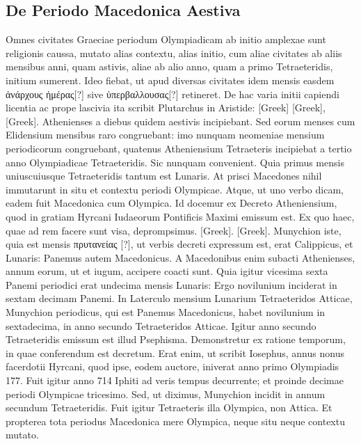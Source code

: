 \subsection{De Periodo Macedonica Aestiva}

Omnes civitates Graeciae periodum Olympiadicam ab initio
amplexae sunt religionis caussa, mutato alias contextu, alias
initio, cum aliae civitates ab aliis mensibus anni, quam astivis,
aliae ab alio anno, quam a primo Tetraeteridis, initium sumerent.
Ideo
fiebat, ut apud diversas civitates idem mensis easdem
 \textgreek{ἀνάρχους ἡμέρας[?]}
sive \textgreek{ὑπερβαλλουσας[?]} retineret.
De hac varia initii capiendi licentia ac
prope lascivia ita scribit Plutarchus in Aristide: \textgreek{[Greek]}
\textgreek{[Greek]},
\textgreek{[Greek]}.
Athenienses a diebus
quidem aestivis incipiebant.
Sed eorum menses cum Elidensium
mensibus raro congruebant: imo nunquam neomeniae mensium periodicorum
congruebant, quatenus Atheniensium Tetraeteris incipiebat
a tertio anno Olympiadicae Tetraeteridis.
Sic nunquam convenient.
Quia primus mensis uniuscuiusque Tetraeteridis tantum est
Lunaris.
At prisci Macedones nihil immutarunt in situ et contextu
periodi Olympicae.
Atque, ut uno verbo dicam, eadem fuit Macedonica
cum Olympica.
Id docemur ex Decreto Atheniensium, quod in
gratiam Hyrcani Iudaeorum Pontificis Maximi emissum est.
Ex quo
haec, quae ad rem facere sunt visa, deprompsimus.
\textgreek{[Greek]}.
\textgreek{[Greek]}.
Munychion
iste, quia est mensis \textgreek{πρυτανείας [?]},
 ut verbis decreti expressum est,
erat Calippicus, et Lunaris: Panemus autem Μacedonicus.
A Macedonibus
enim subacti Athenienses, annum eorum, ut et iugum, accipere
coacti sunt.
Quia igitur vicesima sexta Panemi periodici erat undecima
mensis Lunaris: Ergo novilunium inciderat in sextam decimam
Panemi.
In Laterculo mensium Lunarium Tetraeteridos Atticae,
Munychion periodicus, qui est Panemus Macedonicus, habet novilunium
in sextadecima, in anno secundo Tetraeteridos Atticae.
Igitur anno
secundo Tetraeteridis emissum est illud Psephisma.
Demonstretur
ex ratione temporum, in quae conferendum est decretum.
Erat enim,
ut scribit Iosephus, annus nonus facerdotii Hyrcani, quod ipse, eodem
auctore, iniverat anno primo Olympiadis 177.
Fuit igitur anno 714
Iphiti ad veris tempus decurrente; et proinde decimae periodi Olympicae
tricesimo.
Sed, ut diximus, Munychion incidit in annum
secundum Tetraeteridis.
Fuit igitur Tetraeteris illa Olympica,
non Attica.
Et propterea tota periodus Macedonica mere Olympica,
neque situ neque contextu mutato.

